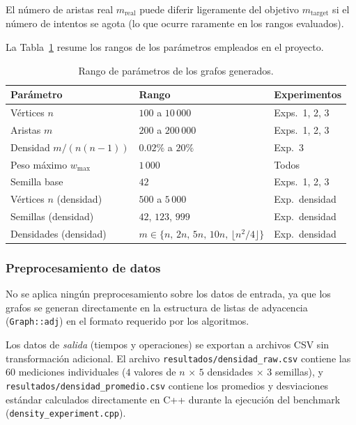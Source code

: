 \noindent El número de aristas real $m_{\text{real}}$ puede diferir
ligeramente del objetivo $m_{\text{target}}$ si el número de intentos se
agota (lo que ocurre raramente en los rangos evaluados).

La Tabla~\ref{tab:rangos} resume los rangos de los parámetros empleados en
el proyecto.

\begin{table}[H]
  \centering
  \caption{Rango de parámetros de los grafos generados.}
  \label{tab:rangos}
  \begin{tabular}{lll}
    \toprule
    \textbf{Parámetro} & \textbf{Rango} & \textbf{Experimentos} \\
    \midrule
    Vértices $n$           & $100$ a $10\,000$          & Exps.\ 1, 2, 3 \\
    Aristas $m$            & $200$ a $200\,000$         & Exps.\ 1, 2, 3 \\
    Densidad $m/(n(n-1))$  & $0.02\%$ a $20\%$         & Exp.\ 3 \\
    Peso máximo $w_{\max}$ & $1\,000$                   & Todos \\
    Semilla base           & $42$                       & Exps.\ 1, 2, 3 \\
    \midrule
    Vértices $n$ (densidad)  & $500$ a $5\,000$         & Exp.\ densidad \\
    Semillas (densidad)      & $42$, $123$, $999$       & Exp.\ densidad \\
    Densidades (densidad)    & $m \in \{n,\,2n,\,5n,\,10n,\,\lfloor n^2/4\rfloor\}$
                             & Exp.\ densidad \\
    \bottomrule
  \end{tabular}
\end{table}

\subsubsection{Preprocesamiento de datos}

No se aplica ningún preprocesamiento sobre los datos de entrada, ya que los
grafos se generan directamente en la estructura de listas de adyacencia
(\texttt{Graph::adj}) en el formato requerido por los algoritmos.

Los datos de \textit{salida} (tiempos y operaciones) se exportan a archivos
CSV sin transformación adicional. El archivo \texttt{resultados/densidad\_raw.csv}
contiene las 60 mediciones individuales ($4$ valores de $n$ $\times$
$5$ densidades $\times$ $3$ semillas), y
\texttt{resultados/densidad\_promedio.csv} contiene los promedios y
desviaciones estándar calculados directamente en C++ durante la ejecución del
benchmark (\texttt{density\_experiment.cpp}).

